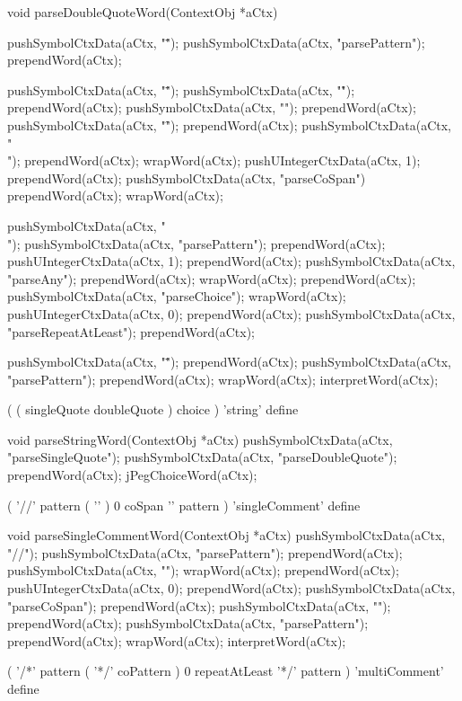 \startCCode
void parseDoubleQuoteWord(ContextObj *aCtx) {
  pushSymbolCtxData(aCtx, "\"");
  pushSymbolCtxData(aCtx, "parsePattern");
  prependWord(aCtx);
  
  pushSymbolCtxData(aCtx, "\"");
  pushSymbolCtxData(aCtx, "\r");
  prependWord(aCtx);
  pushSymbolCtxData(aCtx, "\n");
  prependWord(aCtx);
  pushSymbolCtxData(aCtx, "\f");
  prependWord(aCtx);
  pushSymbolCtxData(aCtx, "\\");
  prependWord(aCtx);
  wrapWord(aCtx);
  pushUIntegerCtxData(aCtx, 1);
  prependWord(aCtx);
  pushSymbolCtxData(aCtx, "parseCoSpan")
  prependWord(aCtx);
  wrapWord(aCtx);
  
  pushSymbolCtxData(aCtx, "\\");
  pushSymbolCtxData(aCtx, "parsePattern");
  prependWord(aCtx);
  pushUIntegerCtxData(aCtx, 1);
  prependWord(aCtx);
  pushSymbolCtxData(aCtx, "parseAny");
  prependWord(aCtx);
  wrapWord(aCtx);
  prependWord(aCtx);
  pushSymbolCtxData(aCtx, "parseChoice");
  wrapWord(aCtx);
  pushUIntegerCtxData(aCtx, 0);
  prependWord(aCtx);
  pushSymbolCtxData(aCtx, "parseRepeatAtLeast");
  prependWord(aCtx);
  
  pushSymbolCtxData(aCtx, "\"");
  prependWord(aCtx);
  pushSymbolCtxData(aCtx, "parsePattern");
  prependWord(aCtx);
  wrapWord(aCtx);
  interpretWord(aCtx);
}
\stopCCode

\starttyping
(
  ( singleQuote doubleQuote ) choice
) 'string' define
\stoptyping

\startCCode
void parseStringWord(ContextObj *aCtx) {
  pushSymbolCtxData(aCtx, "parseSingleQuote");
  pushSymbolCtxData(aCtx, "parseDoubleQuote");
  prependWord(aCtx);
  jPegChoiceWord(aCtx);
}
\stopCCode

\starttyping
(
  '//' pattern
  ( '\n' ) 0 coSpan
  '\n' pattern
) 'singleComment' define
\stoptyping

\startCCode
void parseSingleCommentWord(ContextObj *aCtx) {
  pushSymbolCtxData(aCtx, "//");
  pushSymbolCtxData(aCtx, "parsePattern");
  prependWord(aCtx);
  pushSymbolCtxData(aCtx, "\n");
  wrapWord(aCtx);
  prependWord(aCtx);
  pushUIntegerCtxData(aCtx, 0);
  prependWord(aCtx);
  pushSymbolCtxData(aCtx, "parseCoSpan");
  prependWord(aCtx);
  pushSymbolCtxData(aCtx, "\n");
  prependWord(aCtx);
  pushSymbolCtxData(aCtx, "parsePattern");
  prependWord(aCtx);
  wrapWord(aCtx);
  interpretWord(aCtx);
}
\stopCCode

\starttyping
(
  '/*' pattern
  ( '*/' coPattern ) 0 repeatAtLeast
  '*/' pattern
) 'multiComment' define
\stoptyping

